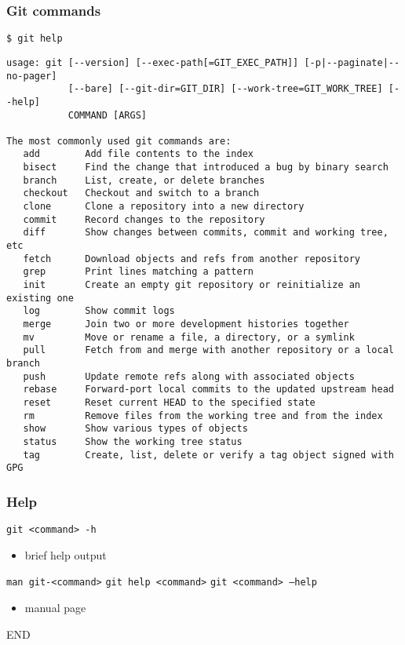 \documentclass[english]{beamer}
\newcommand{\CMD}[1]{
  \texttt{\textcolor{code-green}{#1}}
}
\begin{document}
\begin{frame}[fragile]
\frametitle{Git commands}
{\tiny
\CMD{\$ git help}
\begin{verbatim}
usage: git [--version] [--exec-path[=GIT_EXEC_PATH]] [-p|--paginate|--no-pager]
           [--bare] [--git-dir=GIT_DIR] [--work-tree=GIT_WORK_TREE] [--help]
           COMMAND [ARGS]

The most commonly used git commands are:
   add        Add file contents to the index
   bisect     Find the change that introduced a bug by binary search
   branch     List, create, or delete branches
   checkout   Checkout and switch to a branch
   clone      Clone a repository into a new directory
   commit     Record changes to the repository
   diff       Show changes between commits, commit and working tree, etc
   fetch      Download objects and refs from another repository
   grep       Print lines matching a pattern
   init       Create an empty git repository or reinitialize an existing one
   log        Show commit logs
   merge      Join two or more development histories together
   mv         Move or rename a file, a directory, or a symlink
   pull       Fetch from and merge with another repository or a local branch
   push       Update remote refs along with associated objects
   rebase     Forward-port local commits to the updated upstream head
   reset      Reset current HEAD to the specified state
   rm         Remove files from the working tree and from the index
   show       Show various types of objects
   status     Show the working tree status
   tag        Create, list, delete or verify a tag object signed with GPG
\end{verbatim}
}
\end{frame}

\begin{frame}
\frametitle{Help}

\texttt{git <command> -h}
\begin{itemize}
        \item brief help output
\end{itemize}

\pause{}
\vspace{.1\textheight}

\texttt{man git-<command>}
\texttt{git help <command>}
\texttt{git <command> --help}
\begin{itemize}
        \item manual page
\end{itemize}

\end{frame}










\begin{frame}
        END
\end{frame}

\end{document}
